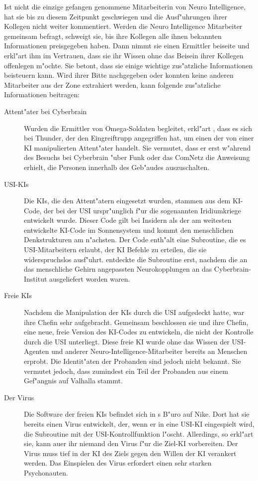 Ist \ml{} nicht die einzige gefangen genommene Mitarbeiterin von Neuro Intelligence, hat sie bis zu diesem Zeitpunkt geschwiegen und die Ausf"uhrungen ihrer Kollegen nicht weiter kommentiert. Werden die Neuro Intelligence Mitarbeiter gemeinsam befragt, schweigt sie, bis ihre Kollegen alle ihnen bekannten Informationen preisgegeben haben. Dann nimmt sie einen Ermittler beiseite und erkl"art ihm im Vertrauen, dass sie ihr Wissen ohne das Beisein ihrer Kollegen offenlegen m"ochte. Sie betont, dass sie einige wichtige zus"atzliche Informationen beisteuern kann. Wird ihrer Bitte nachgegeben oder konnten keine anderen Mitarbeiter aus der Zone extrahiert werden, kann \ml{} folgende zus"atzliche Informationen beitragen:

\begin{description}
	\item[Attent"ater bei Cyberbrain] Wurden die Ermittler von Omega-Soldaten begleitet, erkl"art \ml{}, dass es sich bei Thunder, der den 	
		Eingreiftrupp angegriffen hat, um einen der von einer KI manipulierten Attent"ater handelt. Sie vermutet, dass er erst w"ahrend des Besuchs bei Cyberbrain "uber Funk oder das ComNetz die Anweisung erhielt, die Personen innerhalb des Geb"audes auszuschalten.
    \item[USI-KIs] Die KIs, die den Attent"atern eingesetzt wurden, stammen aus dem KI-Code, der bei der USI urspr"unglich f"ur die 
		sogenannten Iridiumkriege entwickelt wurde. Dieser Code gilt bei Insidern als der am weitesten entwickelte KI-Code im Sonnensystem und kommt den menschlichen Denkstrukturen am n"achsten. Der Code enth"alt eine Subroutine, die es USI-Mitarbeitern erlaubt, der KI Befehle zu erteilen, die sie widerspruchslos ausf"uhrt. \ml{} entdeckte die Subroutine erst, nachdem die an das menschliche Gehirn angepassten Neurokopplungen an das Cyberbrain-Institut ausgeliefert worden waren.
	\item[Freie KIs] Nachdem \ml{} die Manipulation der KIs durch die USI aufgedeckt hatte, war ihre Chefin sehr aufgebracht. Gemeinsam 
		beschlossen sie und ihre Chefin, eine neue, freie Version des KI-Codes zu entwickeln, die nicht der Kontrolle durch die USI unterliegt. Diese freie KI wurde ohne das Wissen der USI-Agenten und anderer Neuro-Intelligence-Mitarbeiter bereits an Menschen erprobt. Die Identit"aten der Probanden sind \ml{} jedoch nicht bekannt. Sie vermutet jedoch, dass zumindest ein Teil der Probanden aus einem Gef"angnis auf Valhalla stammt.
	\item[Der Virus] Die Software der freien KIs befindet sich in \ml{}s B"uro auf Nike. Dort hat sie bereits einen Virus entwickelt, der, 
		wenn er in eine USI-KI eingespielt wird, die Subroutine mit der USI-Kontrollfunktion l"oscht. Allerdings, so erkl"art sie, kann au\3er ihr niemand den Virus f"ur die Ziel-KI vorbereiten. Der Virus muss tief in der KI des Ziels gegen den Willen der KI verankert werden. Das Einspielen des Virus erfordert einen sehr starken Psychonauten.
\end{description}

